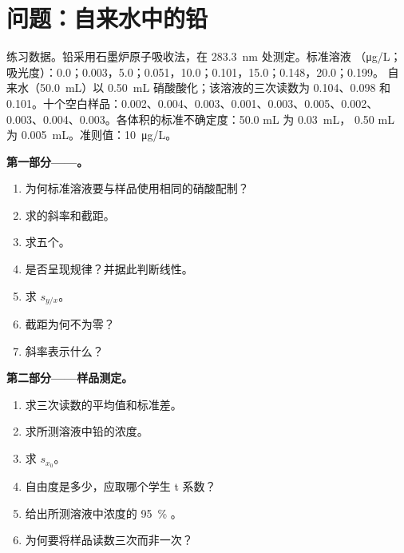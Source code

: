 \section{问题：自来水中的铅}

\begin{problem}
\label{pb:b2:measurement-statistics:1}
练习数据。铅采用石墨炉原子吸收法，在 \qty{283.3}{nm} 处测定。标准溶液
（\unit{\micro g/L}；吸光度）：0.0；0.003，5.0；0.051，10.0；0.101，15.0；0.148，20.0；0.199。
自来水（\qty{50.0}{mL}）以 \qty{0.50}{mL} 硝酸酸化；该溶液的三次读数为
0.104、0.098 和 0.101。十个空白样品：0.002、0.004、0.003、0.001、0.003、0.005、0.002、
0.003、0.004、0.003。各体积的标准不确定度：50.0 mL 为 \qty{0.03}{mL}，
0.50 mL 为 \qty{0.005}{mL}。准则值：\qty{10}{\micro g/L}。

\medskip
\noindent\textbf{第一部分——。}
\begin{enumerate}
  \item 为何标准溶液要与样品使用相同的硝酸配制？
  \item 求的斜率和截距。
  \item 求五个。
  \item {}是否呈现规律？并据此判断线性。
  \item 求 $s_{y/x}$。
  \item 截距为何不为零？
  \item 斜率表示什么？
\end{enumerate}

\medskip
\noindent\textbf{第二部分——样品测定。}
\begin{enumerate}[resume]
  \item 求三次读数的平均值和标准差。
  \item 求所测溶液中铅的浓度。
  \item 求 $s_{x_0}$。
  \item 自由度是多少，应取哪个学生 t 系数？
  \item 给出所测溶液中浓度的 95~\% 。
  \item 为何要将样品读数三次而非一次？
\end{enumerate}


\end{problem}
